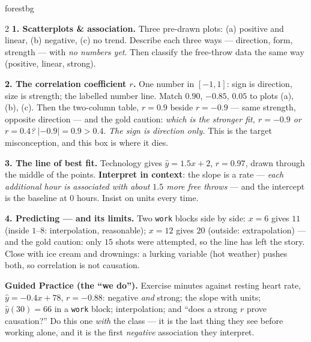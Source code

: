 \documentclass[10pt]{article}
\begin{document}
\begin{skillbox}{forestbg}
\begin{multicols}{2}
\textbf{1. Scatterplots \& association.} Three pre-drawn plots: (a) positive and linear, (b)
negative, (c) no trend. Describe each three ways --- direction, form, strength --- with \emph{no
numbers yet}. Then classify the free-throw data the same way (positive, linear, strong).

\textbf{2. The correlation coefficient $r$.} One number in $[-1,1]$: sign is direction, size is
strength; the labelled number line. Match $0.90$, $-0.85$, $0.05$ to plots (a), (b), (c). Then the
two-column table, $r=0.9$ beside $r=-0.9$ --- same strength, opposite direction --- and the gold
caution: \emph{which is the stronger fit, $r=-0.9$ or $r=0.4$?} $|{-0.9}|=0.9>0.4$. \emph{The sign
is direction only.} This is the target misconception, and this box is where it dies.

\columnbreak
\textbf{3. The line of best fit.} Technology gives $\hat y=1.5x+2$, $r=0.97$, drawn through the
middle of the points. \textbf{Interpret in context}: the slope is a rate --- \emph{each additional
hour is associated with about $1.5$ more free throws} --- and the intercept is the baseline at
$0$ hours. Insist on units every time.

\textbf{4. Predicting --- and its limits.} Two \texttt{work} blocks side by side: $x=6$ gives
$11$ (inside $1$--$8$: interpolation, reasonable); $x=12$ gives $20$ (outside: extrapolation) ---
and the gold caution: only $15$ shots were attempted, so the line has left the story. Close with
ice cream and drownings: a lurking variable (hot weather) pushes both, so correlation is not
causation.

\textbf{Guided Practice (the ``we do'').} Exercise minutes against resting heart rate,
$\hat y=-0.4x+78$, $r=-0.88$: negative \emph{and} strong; the slope with units; $\hat y(30)=66$ in
a \texttt{work} block; interpolation; and ``does a strong $r$ prove causation?'' Do this one
\emph{with} the class --- it is the last thing they see before working alone, and it is the first
\emph{negative} association they interpret.
\end{multicols}
\end{skillbox}
\end{document}
